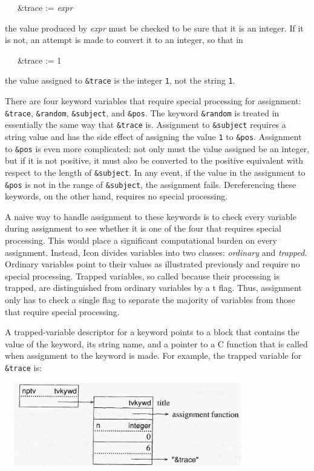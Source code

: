 {\ttfamily\mdseries
\ \ \ \&trace := \textit{expr}}

\noindent the value produced by \textit{expr} must be checked to be
sure that it is an integer. If it is not, an attempt is made to
convert it to an integer, so that in

{\ttfamily\mdseries
\ \ \ \&trace := {\textquotedbl}1{\textquotedbl}}

\noindent the value assigned to \texttt{\&trace} is the integer
\texttt{1}, not the string \texttt{{\textquotedbl}1{\textquotedbl}}.

There are four keyword variables that require special processing for
assignment: \texttt{\&trace}, \texttt{\&random}, \texttt{\&subject},
and \texttt{\&pos}. The keyword \texttt{\&random} is treated in
essentially the same way that \texttt{\&trace} is. Assignment to
\texttt{\&subject} requires a string value and has the side effect of
assigning the value \texttt{1} to \texttt{\&pos}. Assignment to
\texttt{\&pos} is even more complicated: not only must the value
assigned be an integer, but if it is not positive, it must also be
converted to the positive equivalent with respect to the length of
\texttt{\&subject}. In any event, if the value in the assignment to
\texttt{\&pos} is not in the range of \texttt{\&subject}, the
assignment fails. Dereferencing these keywords, on the other hand,
requires no special processing.

A naive way to handle assignment to these keywords is to check every
variable during assignment to see whether it is one of the four that
requires special processing. This would place a significant
computational burden on every assignment.  Instead, Icon divides
variables into two classes: \textit{ordinary} and
\textit{trapped}. Ordinary variables point to their values as
illustrated previously and require no special processing. Trapped
variables, so called because their processing is
{\textquotedbl}trapped,{\textquotedbl} are distinguished from ordinary
variables by a t flag. Thus, assignment only has to check a single
flag to separate the majority of variables from those that require
special processing.

A trapped-variable descriptor for a keyword points to a block that
contains the value of the keyword, its string name, and a pointer to a
C function that is called when assignment to the keyword is made. For
example, the trapped variable for \texttt{\&trace} is:

\ \  \includegraphics[width=3.9543in,height=1.4398in]{ib-img/ib-img017.jpg} 

